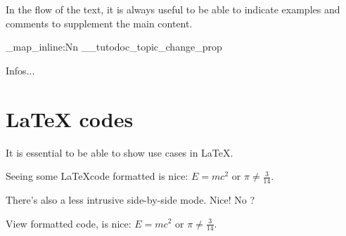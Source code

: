 \documentclass[theme = bw]{tutodoc}
\newcommand\myexrmktext{
    In the flow of the text, it is always useful to be able to indicate examples and comments to supplement the main content.
}
\begin{document}
\myexrmktext

\ExplSyntaxOn

\prop_map_inline:Nn \g__tutodoc_topic_change_prop {
    \begin{tdoc#1}
        \item Infos...
    \end{tdoc#1}
}

\ExplSyntaxOff


\section{LaTeX codes}

It is essential to be able to show use cases in \LaTeX.

\begin{tdoclatex}
Seeing some \LaTeX code formatted is nice: $E = m c^2$ or $\pi \neq \frac{3}{14}$.
\end{tdoclatex}


There's also a less intrusive side-by-side mode. Nice! No ?

\begin{tdoclatex}[sbs]
View formatted code,
is nice: $E = m c^2$ or
$\pi \neq \frac{3}{14}$.
\end{tdoclatex}
\end{document}
